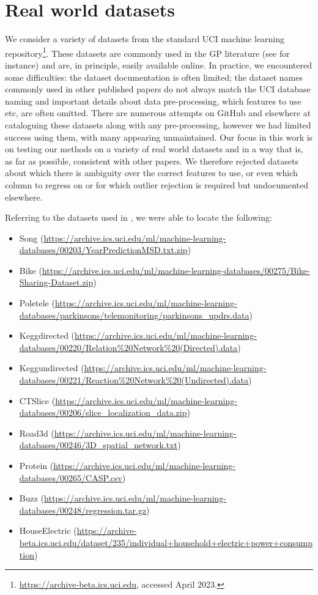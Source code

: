 \section{Real world datasets}\label{appx:real_world_data}
We consider a variety of datasets from the standard UCI machine learning repository\footnote{\url{https://archive-beta.ics.uci.edu}, accessed April 2023.}.
These datasets are commonly used in the GP literature (see \cite{Gard1} for instance) and are, in principle, easily available online.
In practice, we encountered some difficulties: the dataset documentation is often limited; the dataset names  commonly used in other published papers  do not always match the UCI database naming and important details about data pre-processing, which features to use etc, are often omitted.
There are numerous attempts on GitHub and elsewhere at cataloguing these datasets along with any pre-processing, however we had limited success using them, with many appearing unmaintained. 
Our focus in this work is on testing our methods on a variety of real world datasets and in a way that is, as far as possible, consistent with other papers. We therefore rejected datasets about which there is ambiguity over the correct features to use, or even which column to regress on or for which outlier rejection is required but undocumented elsewhere.

\medskip
Referring to the datasets used in \cite{Gard1}, we were able to locate the following: 
\begin{itemize}
    \item Song (\url{https://archive.ics.uci.edu/ml/machine-learning-databases/00203/YearPredictionMSD.txt.zip})
    \item Bike (\url{https://archive.ics.uci.edu/ml/machine-learning-databases/00275/Bike-Sharing-Dataset.zip})
    \item Poletele (\url{https://archive.ics.uci.edu/ml/machine-learning-databases/parkinsons/telemonitoring/parkinsons_updrs.data})
    \item Keggdirected (\url{https://archive.ics.uci.edu/ml/machine-learning-databases/00220/Relation\%20Network\%20(Directed).data})
    \item Keggundirected (\url{https://archive.ics.uci.edu/ml/machine-learning-databases/00221/Reaction\%20Network\%20(Undirected).data})
    \item CTSlice (\url{https://archive.ics.uci.edu/ml/machine-learning-databases/00206/slice_localization_data.zip})
    \item Road3d (\url{https://archive.ics.uci.edu/ml/machine-learning-databases/00246/3D_spatial_network.txt})
    \item Protein (\url{https://archive.ics.uci.edu/ml/machine-learning-databases/00265/CASP.csv})
    \item Buzz (\url{https://archive.ics.uci.edu/ml/machine-learning-databases/00248/regression.tar.gz})
    \item HouseElectric (\url{https://archive-beta.ics.uci.edu/dataset/235/individual+household+electric+power+consumption})
\end{itemize}

